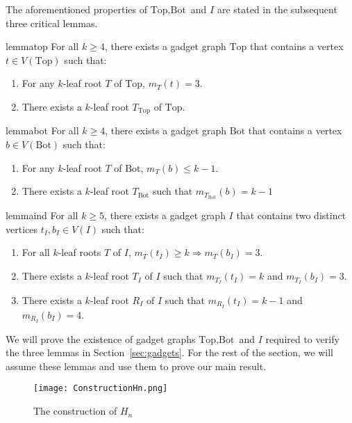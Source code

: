 \documentclass[11pt,letter]{article}
\theoremstyle{remark}
\newcommand{\T}{\text{Top}}
\newcommand{\B}{\text{Bot}}
\begin{document}
The aforementioned properties of $\T, \B$ and $I$ are stated in the subsequent three critical lemmas.

\begin{restatable}{lemma}{top}
    \label{lem:top}
For all $k\geq 4 $, there exists a gadget graph $\T$ that contains a vertex $t\in V(\T)$ such that:
\begin{enumerate}
        \item For any $k$-leaf root $T$ of $\T$, $m_{T}(t) = 3$.
        \item There exists a $k$-leaf root $T_{\T}$ of  $\T$.
    \end{enumerate}
\end{restatable}

\begin{restatable}{lemma}{bot}\label{lem:bottom}
For all $k\geq 4$, there exists a gadget graph $\B$ that contains a vertex $b \in V(\B)$ such that:
\begin{enumerate}
        \item For any $k$-leaf root $T$ of $\B$, $m_T(b) \leq k-1$.
        \item There exists a $k$-leaf root $T_{\B}$ such that $m_{T_{\B}}(b) = k-1$
\end{enumerate}
\end{restatable}   
\begin{restatable}{lemma}{ind}\label{lem:induction}
For all $k\geq 5$, there exists a gadget graph $I$ that contains two distinct vertices $t_I,b_I\in V(I)$ such that:
\begin{enumerate}
        \item For all $k$-leaf roots $T$ of $I$, $m_T(t_I)\geq k\Longrightarrow m_T(b_I)=3$.
        \item There exists a $k$-leaf root $T_I$ of $I$ such that $m_{T_I}(t_I)=k$ and $m_{T_I}(b_I)=3$.
        \item There exists a $k$-leaf root $R_I$ of $I$ such that $m_{R_I}(t_I)=k-1$ and $m_{R_I}(b_I)=4$.
    \end{enumerate}    
\end{restatable}

We will prove the existence of gadget graphs
$\T, \B$ and $I$ required to verify the three lemmas in Section~\ref{sec:gadgets}.
For the rest of the section, we will assume these lemmas and use them to prove our main result.

\begin{figure}[h!]
    \centering
    \texttt{[image: ConstructionHn.png]}
    \caption{The construction of $H_n$}\label{fig:Hn}
\end{figure}
\end{document}
